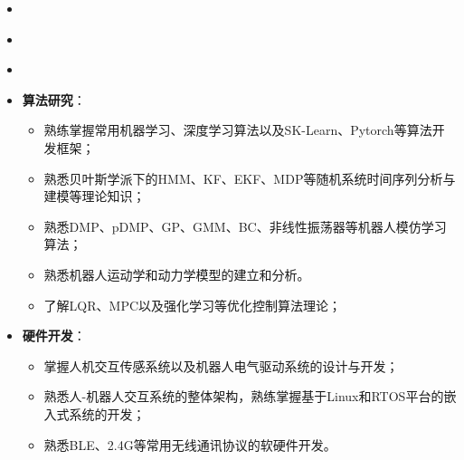 \begin{itemize}[leftmargin=*]
  \item {}
\end{itemize}

\vspace{-1mm}
\begin{itemize}[leftmargin=*]
  \item {}
\end{itemize}

\vspace{-1mm}
\begin{itemize}[leftmargin=*]
  \item {}
\end{itemize}

\vspace{-1mm}
\begin{itemize}[leftmargin=*]
  \item \textbf{算法研究}：
  {\small
  \begin{itemize}
    \item 熟练掌握常用机器学习、深度学习算法以及SK-Learn、Pytorch等算法开发框架；
    \item 熟悉贝叶斯学派下的HMM、KF、EKF、MDP等随机系统时间序列分析与建模等理论知识；
    \item 熟悉DMP、pDMP、GP、GMM、BC、非线性振荡器等机器人模仿学习算法；
    \item 熟悉机器人运动学和动力学模型的建立和分析。
    \item 了解LQR、MPC以及强化学习等优化控制算法理论；
  \end{itemize}}
\end{itemize}

\vspace{-3mm}
\begin{itemize}[leftmargin=*]
  \item \textbf{硬件开发}：
  {\small
  \begin{itemize}
    \item 掌握人机交互传感系统以及机器人电气驱动系统的设计与开发；
    \item 熟悉人-机器人交互系统的整体架构，熟练掌握基于Linux和RTOS平台的嵌入式系统的开发；
    \item 熟悉BLE、2.4G等常用无线通讯协议的软硬件开发。
  \end{itemize}}
\end{itemize}

